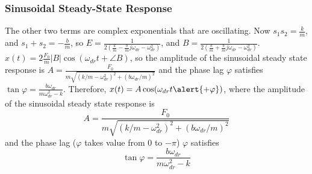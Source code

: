 \begin{frame}
\frametitle{Sinusoidal Steady-State Response}
The other two terms are \alert{complex exponentials} that are \alert{oscillating}. Now $s_1 s_2=\frac{k}{m}$, and $s_1+s_2=-\frac{b}{m}$, so $E=\frac{1}{2(\frac{k}{m}-\frac{b}{m}j\omega_{dr}-\omega_{dr}^{2})}$, and $B=\frac{1}{2(\frac{k}{m}+\frac{b}{m}j\omega_{dr}-\omega_{dr}^{2})}$. $x(t)=2\frac{F_0}{m}|B|\cos(\omega_{dr}t+\angle B)$, so the \alert{amplitude} of the \alert{sinusoidal steady state response} is $A=\frac{F_0}{m\sqrt{(k/m-\omega_{dr}^{2})^2+(b\omega_{dr}/m)^2}}$ and the \alert{phase lag} $\varphi$ satisfies $\tan\varphi=\frac{b\omega_{dr}}{m\omega_{dr}^{2}-k}$. Therefore,
$x(t)=A\cos(\omega_{dr}t\alert{+\varphi})$, where the amplitude of the sinusoidal steady state response is \[A=\frac{F_0}{m\sqrt{(k/m-\omega_{dr}^{2})^2+(b\omega_{dr}/m)^2}}\] and the phase lag (\alert{$\varphi$ takes value from $0$ to $-\pi$}) $\varphi$ satisfies \[\tan\varphi=\frac{b\omega_{dr}}{m\omega_{dr}^{2}-k}\]
\end{frame}
